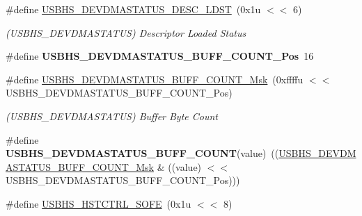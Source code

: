 \begin{DoxyCompactItemize}
\mbox{\label{group__SAMS70__USBHS_ga35b0093e492bed9ea99e21a1cbd3d2ad}} 
\#define \mbox{\hyperlink{group__SAMS70__USBHS_ga35b0093e492bed9ea99e21a1cbd3d2ad}{U\+S\+B\+H\+S\+\_\+\+D\+E\+V\+D\+M\+A\+S\+T\+A\+T\+U\+S\+\_\+\+D\+E\+S\+C\+\_\+\+L\+D\+ST}}~(0x1u $<$$<$ 6)
\begin{DoxyCompactList}\small\item\em (U\+S\+B\+H\+S\+\_\+\+D\+E\+V\+D\+M\+A\+S\+T\+A\+T\+US) Descriptor Loaded Status \end{DoxyCompactList}\item 
\mbox{\label{group__SAMS70__USBHS_ga988543f1a187b28d82e02a88465a023b}} 
\#define {\bfseries U\+S\+B\+H\+S\+\_\+\+D\+E\+V\+D\+M\+A\+S\+T\+A\+T\+U\+S\+\_\+\+B\+U\+F\+F\+\_\+\+C\+O\+U\+N\+T\+\_\+\+Pos}~16
\item 
\mbox{\label{group__SAMS70__USBHS_ga6441367716baec1f6e76bb93f74fde59}} 
\#define \mbox{\hyperlink{group__SAMS70__USBHS_ga6441367716baec1f6e76bb93f74fde59}{U\+S\+B\+H\+S\+\_\+\+D\+E\+V\+D\+M\+A\+S\+T\+A\+T\+U\+S\+\_\+\+B\+U\+F\+F\+\_\+\+C\+O\+U\+N\+T\+\_\+\+Msk}}~(0xffffu $<$$<$ U\+S\+B\+H\+S\+\_\+\+D\+E\+V\+D\+M\+A\+S\+T\+A\+T\+U\+S\+\_\+\+B\+U\+F\+F\+\_\+\+C\+O\+U\+N\+T\+\_\+\+Pos)
\begin{DoxyCompactList}\small\item\em (U\+S\+B\+H\+S\+\_\+\+D\+E\+V\+D\+M\+A\+S\+T\+A\+T\+US) Buffer Byte Count \end{DoxyCompactList}\item 
\mbox{\label{group__SAMS70__USBHS_ga6299edf554c36e9fb1beb29b8a55b08a}} 
\#define {\bfseries U\+S\+B\+H\+S\+\_\+\+D\+E\+V\+D\+M\+A\+S\+T\+A\+T\+U\+S\+\_\+\+B\+U\+F\+F\+\_\+\+C\+O\+U\+NT}(value)~((\mbox{\hyperlink{group__SAMV71__USBHS_ga6441367716baec1f6e76bb93f74fde59}{U\+S\+B\+H\+S\+\_\+\+D\+E\+V\+D\+M\+A\+S\+T\+A\+T\+U\+S\+\_\+\+B\+U\+F\+F\+\_\+\+C\+O\+U\+N\+T\+\_\+\+Msk}} \& ((value) $<$$<$ U\+S\+B\+H\+S\+\_\+\+D\+E\+V\+D\+M\+A\+S\+T\+A\+T\+U\+S\+\_\+\+B\+U\+F\+F\+\_\+\+C\+O\+U\+N\+T\+\_\+\+Pos)))
\item 
\mbox{\label{group__SAMS70__USBHS_ga09aa0f04e6a75533e7bf8062fdb0ef5a}} 
\#define \mbox{\hyperlink{group__SAMS70__USBHS_ga09aa0f04e6a75533e7bf8062fdb0ef5a}{U\+S\+B\+H\+S\+\_\+\+H\+S\+T\+C\+T\+R\+L\+\_\+\+S\+O\+FE}}~(0x1u $<$$<$ 8)

\end{DoxyCompactItemize}
